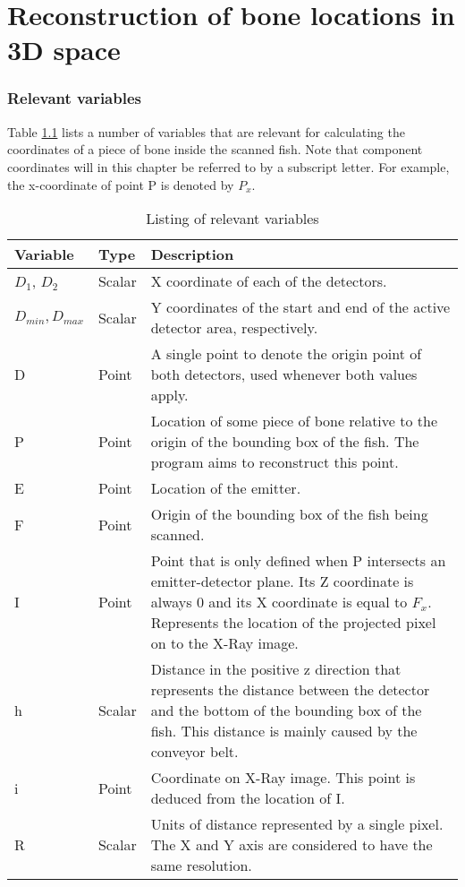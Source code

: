 
\chapter{Reconstruction of bone locations in 3D space}
\subsection{Relevant variables}
Table \ref{table:imageProcessingVariables} lists a number of variables that are relevant for calculating the coordinates of a piece of bone inside the scanned fish. Note that component coordinates will in this chapter be referred to by a subscript letter. For example, the x-coordinate of point P is denoted by $P_x$.

\begin{table}[hpt!]
\begin{tabular}{ |p{2cm}|p{1.1cm}|p{12cm}| } 
 \hline
	\textbf{Variable} & \textbf{Type} & \textbf{Description} \\ 
\hline
	$D_1$, $D_2$ & Scalar & X coordinate of each of the detectors. \\ 
	\hline
	$D_{min}, D_{max}$ & Scalar & Y coordinates of the start and end of the active detector area, respectively. \\
	\hline
	D & Point & A single point to denote the origin point of both detectors, used whenever both values apply. \\
	\hline
	P & Point & Location of some piece of bone relative to the origin of the bounding box of the fish. The program aims to reconstruct this point. \\
	\hline
	E & Point & Location of the emitter.\\
	\hline
	F & Point & Origin of the bounding box of the fish being scanned.\\
	\hline
	I & Point & Point that is only defined when P intersects an emitter-detector plane. Its Z coordinate is always 0 and its X coordinate is equal to $F_x$. Represents the location of the projected pixel on to the X-Ray image.\\
	\hline
	h & Scalar & Distance in the positive z direction that represents the distance between the detector and the bottom of the bounding box of the fish. This distance is mainly caused by the conveyor belt.\\
	\hline
	i & Point & Coordinate on X-Ray image. This point is deduced from the location of I. \\
	\hline
	R & Scalar & Units of distance represented by a single pixel. The X and Y axis are considered to have the same resolution. \\
\hline
\end{tabular}
\caption{Listing of relevant variables}
\label{table:imageProcessingVariables}
\end{table}

